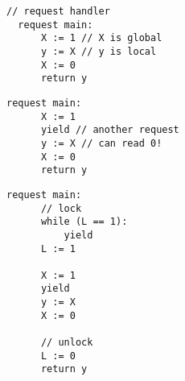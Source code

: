 \noindent
\begin{minipage}[t]{0.55\textwidth}
	\begin{minipage}[t]{\textwidth}
		\begin{lstlisting}[caption={Without yield (serializable)},
			label={lst:MotivatingExample1Ser}]
  // request handler           
  request main: 
      X := 1 // X is global
      y := X // y is local
      X := 0
      return y 
		\end{lstlisting}
	\end{minipage}
	\vspace{1em}
	\begin{minipage}[t]{\textwidth}
		\begin{lstlisting}[caption={With yield (not serializable)},
			label={lst:MotivatingExample2NonSer}]
  request main: 
      X := 1 
      yield // another request
      y := X // can read 0!
      X := 0
      return y 	
		\end{lstlisting}
	\end{minipage}
\end{minipage}%
\hfill
\begin{minipage}[t]{0.35\textwidth}
	\begin{lstlisting}[caption={With yield and lock (serializable)},
		label={lst:MotivatingExample3Ser}]
  request main: 
      // lock
      while (L == 1): 
          yield
      L := 1 

      X := 1
      yield
      y := X 
      X := 0

      // unlock    
      L := 0
      return y 
	\end{lstlisting}
\end{minipage}

